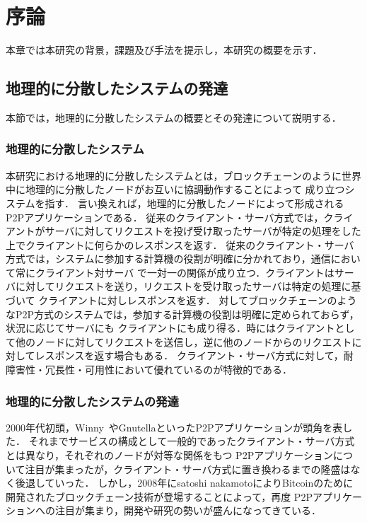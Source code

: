 \chapter{序論}
\label{introduction}

本章では本研究の背景，課題及び手法を提示し，本研究の概要を示す．

\section{地理的に分散したシステムの発達}
\label{introduction:system-growth}
本節では，地理的に分散したシステムの概要とその発達について説明する．

\subsection{地理的に分散したシステム}
本研究における地理的に分散したシステムとは，ブロックチェーンのように世界中に地理的に分散したノードがお互いに協調動作することによって
成り立つシステムを指す．
言い換えれば，地理的に分散したノードによって形成されるP2Pアプリケーションである．
従来のクライアント・サーバ方式では，クライアントがサーバに対してリクエストを投げ受け取ったサーバが特定の処理をした上でクライアントに何らかのレスポンスを返す．
従来のクライアント・サーバ方式では，システムに参加する計算機の役割が明確に分かれており，通信において常にクライアント対サーバ
で一対一の関係が成り立つ．クライアントはサーバに対してリクエストを送り，リクエストを受け取ったサーバは特定の処理に基づいて
クライアントに対しレスポンスを返す．
対してブロックチェーンのようなP2P方式のシステムでは，参加する計算機の役割は明確に定められておらず，状況に応じてサーバにも
クライアントにも成り得る．時にはクライアントとして他のノードに対してリクエストを送信し，逆に他のノードからのリクエストに
対してレスポンスを返す場合もある．
クライアント・サーバ方式に対して，耐障害性・冗長性・可用性において優れているのが特徴的である．

\subsection{地理的に分散したシステムの発達}
2000年代初頭，Winny~\cite{Winny}やGnutellaといったP2Pアプリケーションが頭角を表した．
それまでサービスの構成として一般的であったクライアント・サーバ方式とは異なり，それぞれのノードが対等な関係をもつ
P2Pアプリケーションについて注目が集まったが，クライアント・サーバ方式に置き換わるまでの隆盛はなく後退していった．
しかし，2008年にsatoshi nakamotoによりBitcoinのために開発されたブロックチェーン技術が登場することによって，再度
P2Pアプリケーションへの注目が集まり，開発や研究の勢いが盛んになってきている．

